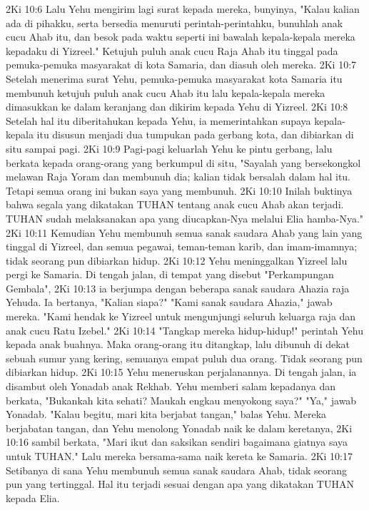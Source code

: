 2Ki 10:6  Lalu Yehu mengirim lagi surat kepada mereka, bunyinya, "Kalau kalian ada di pihakku, serta bersedia menuruti perintah-perintahku, bunuhlah anak cucu Ahab itu, dan besok pada waktu seperti ini bawalah kepala-kepala mereka kepadaku di Yizreel." Ketujuh puluh anak cucu Raja Ahab itu tinggal pada pemuka-pemuka masyarakat di kota Samaria, dan diasuh oleh mereka.
2Ki 10:7  Setelah menerima surat Yehu, pemuka-pemuka masyarakat kota Samaria itu membunuh ketujuh puluh anak cucu Ahab itu lalu kepala-kepala mereka dimasukkan ke dalam keranjang dan dikirim kepada Yehu di Yizreel.
2Ki 10:8  Setelah hal itu diberitahukan kepada Yehu, ia memerintahkan supaya kepala-kepala itu disusun menjadi dua tumpukan pada gerbang kota, dan dibiarkan di situ sampai pagi.
2Ki 10:9  Pagi-pagi keluarlah Yehu ke pintu gerbang, lalu berkata kepada orang-orang yang berkumpul di situ, "Sayalah yang bersekongkol melawan Raja Yoram dan membunuh dia; kalian tidak bersalah dalam hal itu. Tetapi semua orang ini bukan saya yang membunuh.
2Ki 10:10  Inilah buktinya bahwa segala yang dikatakan TUHAN tentang anak cucu Ahab akan terjadi. TUHAN sudah melaksanakan apa yang diucapkan-Nya melalui Elia hamba-Nya."
2Ki 10:11  Kemudian Yehu membunuh semua sanak saudara Ahab yang lain yang tinggal di Yizreel, dan semua pegawai, teman-teman karib, dan imam-imamnya; tidak seorang pun dibiarkan hidup.
2Ki 10:12  Yehu meninggalkan Yizreel lalu pergi ke Samaria. Di tengah jalan, di tempat yang disebut "Perkampungan Gembala",
2Ki 10:13  ia berjumpa dengan beberapa sanak saudara Ahazia raja Yehuda. Ia bertanya, "Kalian siapa?" "Kami sanak saudara Ahazia," jawab mereka. "Kami hendak ke Yizreel untuk mengunjungi seluruh keluarga raja dan anak cucu Ratu Izebel."
2Ki 10:14  "Tangkap mereka hidup-hidup!" perintah Yehu kepada anak buahnya. Maka orang-orang itu ditangkap, lalu dibunuh di dekat sebuah sumur yang kering, semuanya empat puluh dua orang. Tidak seorang pun dibiarkan hidup.
2Ki 10:15  Yehu meneruskan perjalanannya. Di tengah jalan, ia disambut oleh Yonadab anak Rekhab. Yehu memberi salam kepadanya dan berkata, "Bukankah kita sehati? Maukah engkau menyokong saya?" "Ya," jawab Yonadab. "Kalau begitu, mari kita berjabat tangan," balas Yehu. Mereka berjabatan tangan, dan Yehu menolong Yonadab naik ke dalam keretanya,
2Ki 10:16  sambil berkata, "Mari ikut dan saksikan sendiri bagaimana giatnya saya untuk TUHAN." Lalu mereka bersama-sama naik kereta ke Samaria.
2Ki 10:17  Setibanya di sana Yehu membunuh semua sanak saudara Ahab, tidak seorang pun yang tertinggal. Hal itu terjadi sesuai dengan apa yang dikatakan TUHAN kepada Elia.
